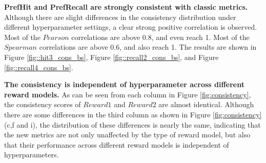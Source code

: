 

\textbf{PrefHit and PrefRecall are strongly consistent with classic metrics.}
Although there are slight differences in the consistency distribution under different hyperparameter settings, a clear strong positive correlation is observed. Most of the \(Pearson\) correlations are above 0.8, and even reach 1. Most of the \(Spearman\) correlations are above 0.6, and also reach 1. The results are shown in Figure \ref{fig::hit3_cons_bs}, Figure \ref{fig::recall2_cons_bs}, and Figure \ref{fig::recall4_cons_bs}.

\textbf{The consistency is independent of hyperparameter across different reward models.}
As can be seen from each column in Figure \ref{fig:consistency}, the consistency scores of \(Reward1\) and \(Reward2\) are almost identical. Although there are some differences in the third column as shown in Figure \ref{fig:consistency}(c,f and i), the distribution of these differences is nearly the same, indicating that the new metrics are not only unaffected by the type of reward model, but also that their performance across different reward models is independent of hyperparameters.

